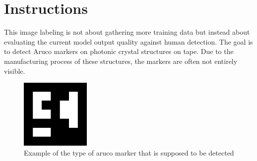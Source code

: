 \documentclass{article}
\begin{document}

    \section*{Instructions}

    This image labeling is not about gathering more training data but instead about evaluating the current model output quality against human detection. The goal is to detect Aruco markers on photonic crystal structures on tape. Due to the manufacturing process of these structures, the markers are often not entirely visible.

    \begin{figure}[h!]
        \begin{center}
          \includegraphics[width=0.3\textwidth]{images/in-img-marker-scaled.png}
        \end{center}
        \caption{Example of the type of aruco marker that is supposed to be detected}
        \label{fig:marker}
    \end{figure}

    

    \newpage
\end{document}
